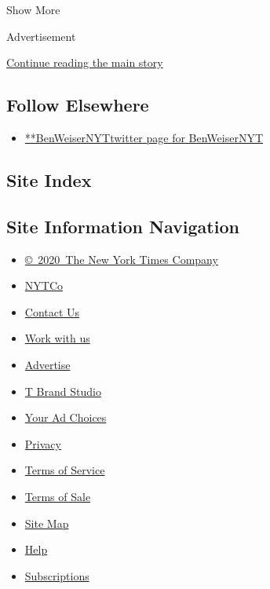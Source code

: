 Show More

Advertisement

\protect\hyperlink{after-mid2}{Continue reading the main story}

\hypertarget{follow-elsewhere}{%
\subsection{Follow Elsewhere}\label{follow-elsewhere}}

\begin{itemize}
\tightlist
\item
  \href{https://twitter.com/BenWeiserNYT}{**BenWeiserNYTtwitter page for
  BenWeiserNYT}
\end{itemize}

\hypertarget{site-index}{%
\subsection{Site Index}\label{site-index}}

\hypertarget{site-information-navigation}{%
\subsection{Site Information
Navigation}\label{site-information-navigation}}

\begin{itemize}
\tightlist
\item
  \href{https://help.nytimes3xbfgragh.onion/hc/en-us/articles/115014792127-Copyright-notice}{©~2020~The
  New York Times Company}
\end{itemize}

\begin{itemize}
\tightlist
\item
  \href{https://www.nytco.com/}{NYTCo}
\item
  \href{https://help.nytimes3xbfgragh.onion/hc/en-us/articles/115015385887-Contact-Us}{Contact
  Us}
\item
  \href{https://www.nytco.com/careers/}{Work with us}
\item
  \href{https://nytmediakit.com/}{Advertise}
\item
  \href{http://www.tbrandstudio.com/}{T Brand Studio}
\item
  \href{https://www.nytimes3xbfgragh.onion/privacy/cookie-policy\#how-do-i-manage-trackers}{Your
  Ad Choices}
\item
  \href{https://www.nytimes3xbfgragh.onion/privacy}{Privacy}
\item
  \href{https://help.nytimes3xbfgragh.onion/hc/en-us/articles/115014893428-Terms-of-service}{Terms
  of Service}
\item
  \href{https://help.nytimes3xbfgragh.onion/hc/en-us/articles/115014893968-Terms-of-sale}{Terms
  of Sale}
\item
  \href{https://spiderbites.nytimes3xbfgragh.onion}{Site Map}
\item
  \href{https://help.nytimes3xbfgragh.onion/hc/en-us}{Help}
\item
  \href{https://www.nytimes3xbfgragh.onion/subscription?campaignId=37WXW}{Subscriptions}
\end{itemize}
